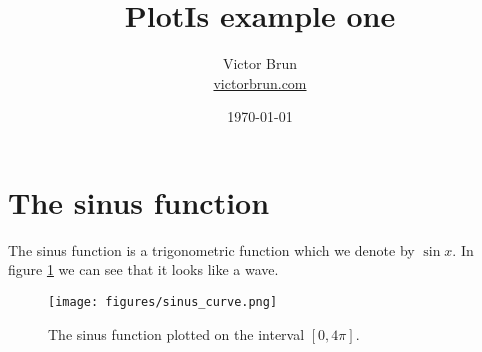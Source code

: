 \documentclass[12pt]{article}
\title{PlotIs example one}
\author{Victor Brun\\ \href{https://victorbrun.com}{victorbrun.com}}
\date{\today}
\begin{document}
\maketitle

\section{The sinus function}
The sinus function is a trigonometric function which we denote by $\sin{x}$. In figure \ref{fig:sin} we can see that it looks like a wave.

\begin{figure}[h]
	\centering
	\texttt{[image: figures/sinus\_curve.png]}
	\caption{The sinus function plotted on the interval $[0, 4\pi]$.}
	\label{fig:sin}
\end{figure}
\end{document}
